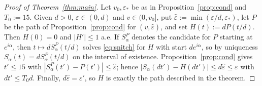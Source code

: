 \begin{proof}[Proof of Theorem~\ref{thm:main}]
Let $v_0,\varepsilon_*$ be as in Proposition~\ref{prop:cond} and $T_0:=15$. Given $d>0$, $\varepsilon\in(0,d)$ and
$v\in(0,v_0]$, put $\hat\varepsilon:=\min(\varepsilon/d,\varepsilon_*)$, let $P$ be the path of
Proposition~\ref{prop:cond} for $(v,\hat\varepsilon)$, and set $H(t):=dP(t/d)$. Then $H(0)=0$ and $|H'|\le1$ a.e. If
$S^P_\alpha$ denotes the candidate for $P$ starting at $e^{i\alpha}$, then $t\mapsto dS^P_\alpha(t/d)$ solves
\eqref{eq:snitch} for $H$ with start $de^{i\alpha}$, so by uniqueness $S_\alpha(t)=dS^P_\alpha(t/d)$ on the interval of
existence. Proposition~\ref{prop:cond} gives $t'\le15$ with $|S^P_\alpha(t')-P(t')|\le\hat\varepsilon$; hence
$|S_\alpha(dt')-H(dt')|\le d\hat\varepsilon\le\varepsilon$ with $dt'\le T_0d$. Finally, $d\hat\varepsilon=\varepsilon'$,
so $H$ is exactly the path described in the theorem.
\end{proof}



